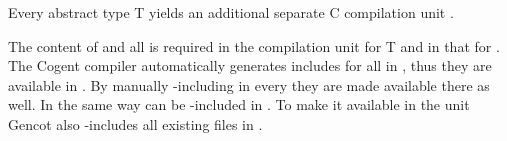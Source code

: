 Every abstract type T yields an additional separate C compilation unit . 

The content of  and all  is required in the compilation unit for T and in 
that for . The Cogent compiler automatically generates includes for all  in 
, 
thus they are available in . By manually -including  in every 
 they are made available there as well. In the same way  can be -included
in . To make it available in the  unit Gencot also -includes all 
existing  files in .


